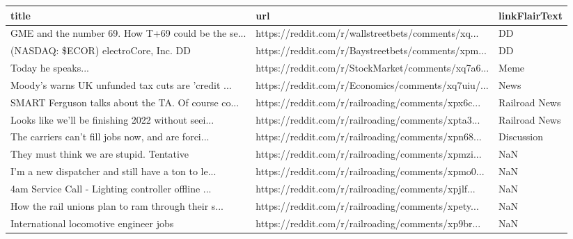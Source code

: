 \documentclass{book}
\begin{document}
  
  
  \begin{table}[htbp]%
  \centering%
  \begin{adjustbox}{width=1\textwidth}%
  \begin{tabular}{lll}
  \toprule
                                               title &                                                url & linkFlairText \\
  \midrule
  GME and the number 69. How T+69 could be the se... & https://reddit.com/r/wallstreetbets/comments/xq... &            DD \\
              (NASDAQ: \$ECOR) electroCore, Inc. {DD} & https://reddit.com/r/Baystreetbets/comments/xpm... &            DD \\
                                  Today he speaks... & https://reddit.com/r/StockMarket/comments/xq7a6... &          Meme \\
  Moody's warns UK unfunded tax cuts are 'credit ... & https://reddit.com/r/Economics/comments/xq7uiu/... &          News \\
  SMART Ferguson talks about the TA. Of course co... & https://reddit.com/r/railroading/comments/xpx6c... & Railroad News \\
  Looks like we'll be finishing 2022 without seei... & https://reddit.com/r/railroading/comments/xpta3... & Railroad News \\
  The carriers can't fill jobs now, and are forci... & https://reddit.com/r/railroading/comments/xpn68... &    Discussion \\
         They must think we are stupid. Tentative #2 & https://reddit.com/r/railroading/comments/xpmzi... &           NaN \\
  I’m a new dispatcher and still have a ton to le... & https://reddit.com/r/railroading/comments/xpmo0... &           NaN \\
  4am Service Call - Lighting controller offline ... & https://reddit.com/r/railroading/comments/xpjlf... &           NaN \\
  How the rail unions plan to ram through their s... & https://reddit.com/r/railroading/comments/xpety... &           NaN \\
              International locomotive engineer jobs & https://reddit.com/r/railroading/comments/xp9br... &           NaN \\
  \bottomrule
  \end{tabular}
  \end{adjustbox}%
  \end{table}
  
\end{document}
